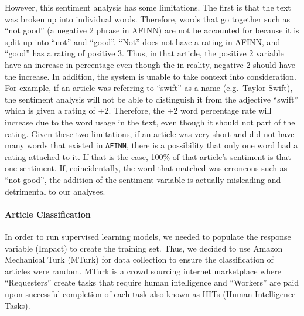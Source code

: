 \documentclass[10pt,letterpaper]{article}
\begin{document}
However, this sentiment analysis has some limitations. The first is that
the text was broken up into individual words. Therefore, words that go
together such as ``not good'' (a negative 2 phrase in AFINN) are not be
accounted for because it is split up into ``not'' and ``good''. ``Not''
does not have a rating in AFINN, and ``good'' has a rating of positive
3. Thus, in that article, the positive 2 variable have an increase in
percentage even though the in reality, negative 2 should have the
increase. In addition, the system is unable to take context into
consideration. For example, if an article was referring to ``swift'' as
a name (e.g.~Taylor Swift), the sentiment analysis will not be able to
distinguish it from the adjective ``swift'' which is given a rating of
+2. Therefore, the +2 word percentage rate will increase due to the word
usage in the text, even though it should not part of the rating. Given
these two limitations, if an article was very short and did not have
many words that existed in \texttt{AFINN}, there is a possibility that
only one word had a rating attached to it. If that is the case, 100\% of
that article's sentiment is that one sentiment. If, coincidentally, the
word that matched was erroneous such as ``not good'', the addition of
the sentiment variable is actually misleading and detrimental to our
analyses.

\paragraph{Article Classification}\label{article-classification}

In order to run supervised learning models, we needed to populate the
response variable (Impact) to create the training set. Thus, we decided
to use Amazon Mechanical Turk (MTurk) for data collection to ensure the
classification of articles were random. MTurk is a crowd sourcing
internet marketplace where ``Requesters'' create tasks that require
human intelligence and ``Workers'' are paid upon successful completion
of each task also known as HITs (Human Intelligence Tasks).
\end{document}
